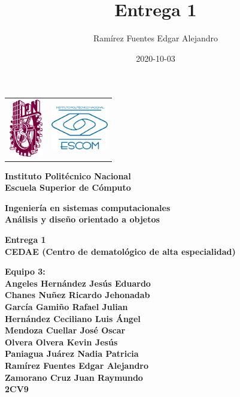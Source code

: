 \documentclass[12pt,letterpaper]{article}
\author{Ram\'irez Fuentes Edgar Alejandro}
\title{Entrega 1}
\date {2020-10-03}
\begin{document}
	\pagestyle{plain}
	{

		{
			\begin{tabular}
				{
					p{} 
					p{} 
				}
				\includegraphics[width=1.5cm, height=2.5cm]{ipn.png} &  
				\includegraphics[width=2.5cm, height=2cm]{escom.png}
			\end{tabular}
		}

		\begin{center}

			\par\vspace{1cm} %
			{
				\Huge\textbf
				{
					Instituto Polit\'ecnico Nacional 
					\\[.2cm]Escuela Superior de C\'omputo
				}
			}

			\par\vspace{0.5cm}
			{
				\Large\textbf
				{
					Ingenier\'ia en sistemas computacionales 
					\\[.5cm]An\'alisis y diseño orientado a objetos
				}
			}

			\vfill

			\par\vspace{0.5cm}
			{
				\Large\textbf
				{
					Entrega 1 \\
					CEDAE (Centro de dematológico de alta especialidad)
				}
			}

			\vfill

			\par\vspace{1cm}
			{
				\large\textbf
				{
                    Equipo 3:
                    \\Angeles Hernández Jesús Eduardo
                    \\Chanes Nuñez Ricardo Jehonadab
                    \\García Gamiño Rafael Julian
                    \\Hernández Ceciliano Luis Ángel
                    \\Mendoza Cuellar José Oscar
                    \\Olvera Olvera Kevin Jesús
                    \\Paniagua Juárez Nadia Patricia
                    \\Ramírez Fuentes Edgar Alejandro
                    \\Zamorano Cruz Juan Raymundo
					\\2CV9
				} 
			}


\end{center}}
\end{document}
